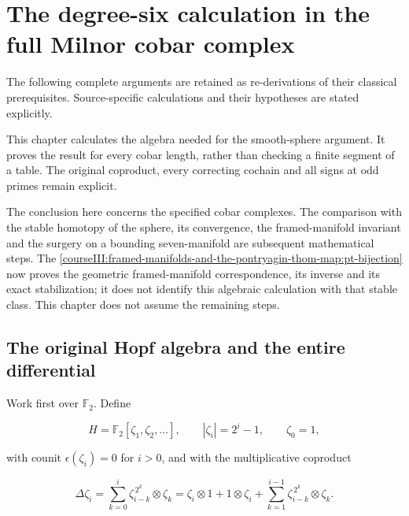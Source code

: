 \section{The degree-six calculation in the full Milnor cobar complex}\label{courseIII:the-degree-six-milnor-cobar-calculation:section}

The following complete arguments are retained as re-derivations of their classical prerequisites. Source-specific calculations and their hypotheses are stated explicitly.

This chapter calculates the algebra needed for the smooth-sphere argument. It proves the result for every cobar length, rather than checking a finite segment of a table. The original coproduct, every correcting cochain and all signs at odd primes remain explicit.

The conclusion here concerns the specified cobar complexes. The comparison with the stable homotopy of the sphere, its convergence, the framed-manifold invariant and the surgery on a bounding seven-manifold are subsequent mathematical steps. The \cref{courseIII:framed-manifolds-and-the-pontryagin-thom-map:pt-bijection} now proves the geometric framed-manifold correspondence, its inverse and its exact stabilization; it does not identify this algebraic calculation with that stable class. This chapter does not assume the remaining steps.

\label{courseIII:the-degree-six-milnor-cobar-calculation:six-cobar-original-complex}

\subsection{The original Hopf algebra and the entire differential}
\label{courseIII:the-degree-six-milnor-cobar-calculation:section-1}

\label{courseIII:milnor-cobar:1.1}

Work first over \(\mathbb F _2\). Define

\begin{equation}
H=\mathbb F _2[\zeta _1,\zeta _2,\ldots],\qquad
 |\zeta _i|=2^i-1,\qquad \zeta _0=1,
 \label{courseIII:the-degree-six-milnor-cobar-calculation:eq:1.1}
\end{equation}

with counit \(\epsilon(\zeta_i)=0\) for \(i>0\), and with the multiplicative coproduct

\begin{equation}
\Delta\zeta_i
 =\sum_{k=0}^{i}\zeta_{i-k}^{\,2^k}\otimes\zeta_k
 =\zeta_i\otimes1+1\otimes\zeta_i+
   \sum_{k=1}^{i-1}\zeta_{i-k}^{\,2^k}\otimes\zeta_k .
 \label{courseIII:the-degree-six-milnor-cobar-calculation:eq:1.2}
\end{equation}

